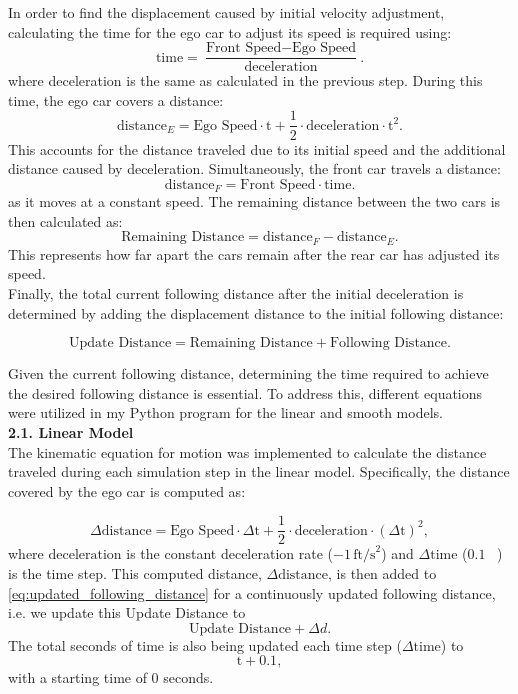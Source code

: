 \documentclass[12pt]{article}
\begin{document}
In order to find the displacement caused by initial velocity adjustment, calculating the time for the ego car to adjust its speed is required using:
\[
\text{time} = \frac{\text{Front Speed} - \text{Ego Speed}}{\text{deceleration}}.
\]
where deceleration is the same as calculated in the previous step. During this time, the ego car covers a distance:
\[
\text{distance}_E = \text{Ego Speed} \cdot \text{t} + \frac{1}{2} \cdot \text{deceleration} \cdot \text{t}^2.
\]
This accounts for the distance traveled due to its initial speed and the additional distance caused by deceleration. Simultaneously, the front car travels a distance:
\[
\text{distance}_F = \text{Front Speed} \cdot \text{time}.
\]
as it moves at a constant speed. The remaining distance between the two cars is then calculated as:
\[
\text{Remaining Distance} = \text{distance}_F - \text{distance}_E.
\]
This represents how far apart the cars remain after the rear car has adjusted its speed.\\
Finally, the total current following distance after the initial deceleration is determined by adding the displacement distance to the initial following distance:

\begin{equation}
\text{Update Distance} = \text{Remaining Distance} + \text{Following Distance}.
\label{eq:updated_following_distance}
\end{equation}

Given the current following distance, determining the time required to achieve the desired following distance is essential. To address this, different equations were utilized in my Python program for the linear and smooth models.\vspace{0.5em} \\

\noindent \textbf{2.1. Linear Model}\\
\indent \setlength{\leftskip}{2em} The kinematic equation for motion was implemented to calculate the distance traveled during each simulation step in the linear model. Specifically, the distance covered by the ego car is computed as:

\[
\Delta \text{distance} = \text{Ego Speed} \cdot \Delta \text{t} + \frac{1}{2} \cdot \text{deceleration} \cdot (\Delta \text{t})^2,
\]
where \(\text{deceleration}\) is the constant deceleration rate (\(-1 \, \text{ft/s}^2\)) and \(\Delta \text{time}\) ($0.1$ \, ) is the time step. This computed distance, \(\Delta \text{distance}\), is then added to \eqref{eq:updated_following_distance} for a continuously updated following distance, i.e. we update this Update Distance to 
\[
\text{Update Distance} + \Delta d.
\]
The total seconds of time is also being updated each time step (\(\Delta \text{time}\)) to
\[
\text{t} + 0.1,
\]
with a starting time of 0 seconds. 
\end{document}
